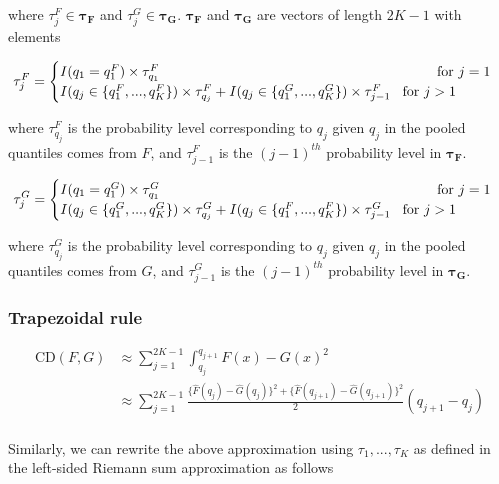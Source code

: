 \documentclass[
]{article}
\begin{document}
where \(\tau^F_j \in \boldsymbol{\tau_F}\) and
\(\tau^G_j \in \boldsymbol{\tau_G}\). \(\boldsymbol{\tau_F}\) and
\(\boldsymbol{\tau_G}\) are vectors of length \(2K-1\) with elements

\[
\tau^F_j=
\begin{cases}
I(q_1=q_1^F)\times \tau_{q_1}^F\hspace{7cm}\text{for }j=1\\
I(q_j\in \{q_1^F, ..., q_{K}^F\})\times \tau_{q_j}^F+I(q_j\in \{q_1^G, ..., q_{K}^G\})\times \tau_{j-1}^F\hspace{0.3cm}\text{for }j>1\\
\end{cases}
\]

where \(\tau_{q_j}^F\) is the probability level corresponding to \(q_j\)
given \(q_j\) in the pooled quantiles comes from \(F\), and
\(\tau_{j-1}^F\) is the \((j-1)^{th}\) probability level in
\(\boldsymbol{\tau_F}\).

\[
\tau^G_j=
\begin{cases}
I(q_1=q_1^G)\times \tau_{q_1}^G\hspace{7cm}\text{for }j=1\\
I(q_j\in \{q_1^G, ..., q_{K}^G\})\times \tau_{q_j}^G+I(q_j\in \{q_1^F,...,q_{K}^F\})\times \tau_{j-1}^G\hspace{0.3cm}\text{for }j>1\\
\end{cases}
\]

where \(\tau_{q_j}^G\) is the probability level corresponding to \(q_j\)
given \(q_j\) in the pooled quantiles comes from \(G\), and
\(\tau_{j-1}^G\) is the \((j-1)^{th}\) probability level in
\(\boldsymbol{\tau_G}\).

\hypertarget{trapezoidal-rule}{%
\subsubsection{Trapezoidal rule}\label{trapezoidal-rule}}

\begin{align}
\text{CD}(F,G) &\approx\sum^{2K-1}_{j=1}\int^{q_{j+1}}_{q_j}{F(x)−G(x)}^2\\
&\approx\sum^{2K-1}_{j=1}\frac{\{\hat{F}(q_j)-\hat{G}(q_j)\}^2+\{\hat{F}(q_{j+1})-\hat{G}(q_{j+1})\}^2}{2}(q_{j+1}-q_{j})\\
\end{align}

Similarly, we can rewrite the above approximation using
\(\tau_1,...,\tau_K\) as defined in the left-sided Riemann sum
approximation as follows
\end{document}
